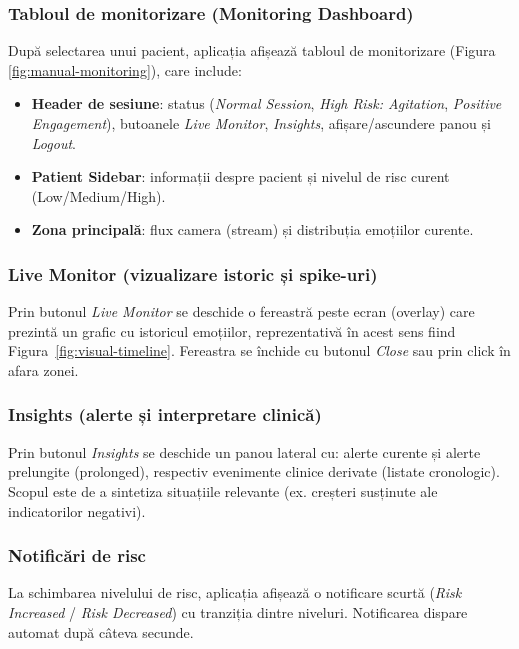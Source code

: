 \subsubsection{Tabloul de monitorizare (Monitoring Dashboard)}
După selectarea unui pacient, aplicația afișează tabloul de monitorizare (Figura \ref{fig:manual-monitoring}), care include:
\begin{itemize}
	\item \textbf{Header de sesiune}: status (\textit{Normal Session}, \textit{High Risk: Agitation}, \textit{Positive Engagement}),
	butoanele \textit{Live Monitor}, \textit{Insights}, afișare/ascundere panou și \textit{Logout}.
	\item \textbf{Patient Sidebar}: informații despre pacient și nivelul de risc curent (Low\newline/Medium/High).
	\item \textbf{Zona principală}: flux camera (stream) și distribuția emoțiilor curente.
\end{itemize}

\subsubsection{Live Monitor (vizualizare istoric și spike-uri)}
Prin butonul \textit{Live Monitor} se deschide o fereastră peste ecran (overlay) care prezintă un grafic cu istoricul emoțiilor, reprezentativă în acest sens fiind Figura~\ref{fig:visual-timeline}. Fereastra se închide cu butonul \textit{Close} sau prin click în afara zonei.

\subsubsection{Insights (alerte și interpretare clinică)}
Prin butonul \textit{Insights} se deschide un panou lateral cu: alerte curente și alerte prelungite (prolonged), respectiv evenimente clinice derivate (listate cronologic). Scopul este de a sintetiza situațiile relevante (ex. creșteri susținute ale indicatorilor negativi).

\subsubsection{Notificări de risc}
La schimbarea nivelului de risc, aplicația afișează o notificare scurtă (\textit{Risk Increased} / \textit{Risk Decreased}) cu tranziția dintre niveluri. Notificarea dispare automat după câteva secunde.